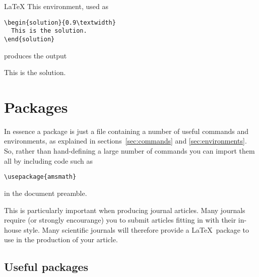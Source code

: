 \begin{chapter}{\LaTeX}
This environment, used as
%
\begin{verbatim}
\begin{solution}{0.9\textwidth}
  This is the solution.
\end{solution}
\end{verbatim}
%
produces the output
%
\begin{solution}{0.9\textwidth}
  This is the solution.
\end{solution}
%

\section{Packages}
\label{sec:packages}

In essence a package is just a file containing a number of useful commands and environments, as explained in sections~\ref{sec:commands} and \ref{sec:environments}. So, rather than hand-defining a large number of commands you can import them all by including code such as
%
\begin{verbatim}
\usepackage{amsmath}
\end{verbatim}
%
in the document preamble.

This is particularly important when producing journal articles. Many journals require (or strongly encourange) you to submit articles fitting in with their in-house style. Many scientific journals will therefore provide a \LaTeX\ package to use in the production of your article.

\subsection{Useful packages}
\label{sec:packages_provided}


\end{chapter}
